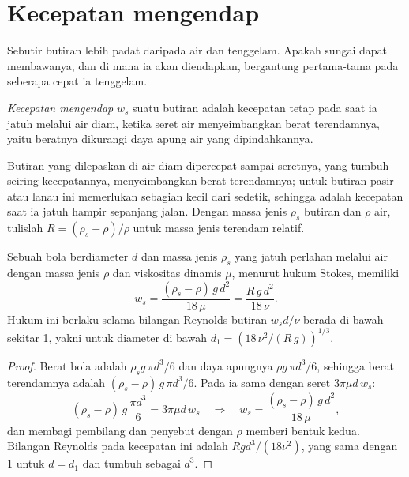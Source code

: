 \section{Kecepatan mengendap}\label{sec:b1:erosion-transport:settling}

Sebutir butiran lebih padat daripada air dan tenggelam. Apakah sungai dapat membawanya, dan di mana ia akan diendapkan, bergantung pertama-tama pada seberapa cepat ia tenggelam.

\begin{definition}\label{def:b1:erosion-transport:settling}
\emph{Kecepatan mengendap} $w_s$ suatu butiran adalah kecepatan tetap pada saat ia jatuh melalui air diam, ketika seret air menyeimbangkan berat terendamnya, yaitu beratnya dikurangi daya apung air yang dipindahkannya.
\end{definition}

Butiran yang dilepaskan di air diam dipercepat sampai seretnya, yang tumbuh seiring kecepatannya, menyeimbangkan berat terendamnya; untuk butiran pasir atau lanau ini memerlukan sebagian kecil dari sedetik, sehingga  adalah kecepatan saat ia jatuh hampir sepanjang jalan. Dengan massa jenis $\rho_s$ butiran dan $\rho$ air, tulislah $R = (\rho_s - \rho)/\rho$ untuk massa jenis terendam relatif.

\begin{proposition}\label{prop:b1:erosion-transport:stokes}
Sebuah bola berdiameter $d$ dan massa jenis $\rho_s$ yang jatuh perlahan melalui air dengan massa jenis $\rho$ dan viskositas dinamis $\mu$, menurut hukum Stokes, memiliki 
\[
  w_s = \frac{(\rho_s - \rho)\,g\,d^2}{18\,\mu} = \frac{R\,g\,d^2}{18\,\nu}.
\]
Hukum ini berlaku selama bilangan Reynolds butiran $w_s d/\nu$ berada di bawah sekitar 1, yakni untuk diameter di bawah $d_1 = \left(18\,\nu^2/(R\,g)\right)^{1/3}$.
\end{proposition}

\begin{proof}
Berat bola adalah $\rho_s g\,\pi d^3/6$ dan daya apungnya $\rho g\,\pi d^3/6$, sehingga berat terendamnya adalah $(\rho_s - \rho)\,g\,\pi d^3/6$.
Pada  ia sama dengan seret $3\pi\mu d\,w_s$:
\[
  (\rho_s - \rho)\,g\,\frac{\pi d^3}{6} = 3\pi\mu d\,w_s
  \quad\Longrightarrow\quad
  w_s = \frac{(\rho_s - \rho)\,g\,d^2}{18\,\mu},
\]
dan membagi pembilang dan penyebut dengan $\rho$ memberi bentuk kedua.
Bilangan Reynolds pada kecepatan ini adalah $R g d^3/(18\nu^2)$, yang sama dengan 1 untuk $d = d_1$ dan tumbuh sebagai $d^3$.
\end{proof}

